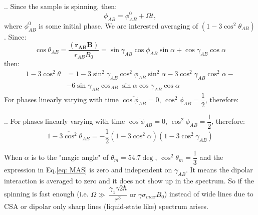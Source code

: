 \documentclass{beamer}
\begin{document}
\begin{frame}{\thesection.\thesubsection. \insertsubsection}
	 Since the sample is spinning, then:
	 \begin{equation}
	 \phi_{AB} = \phi_{AB}^0 + \Omega t,
	 \end{equation}
	 where $\phi_{AB}^0$ is some initial phase.
   We are interested averaging of $(1 - 3 \cos^2 \theta_{AB})$. Since:
   \begin{equation}
      \cos \theta_{AB} = \dfrac{(\bm{r_{AB}}  \bm{B})}{r_{AB} B_0} = \sin \gamma_{AB} \cos \phi_{AB} \sin \alpha + \cos \gamma_{AB} \cos \alpha
   \end{equation}
    then:
   \begin{align}
     1 - 3 \cos^2 \theta &= 1 - 3 \sin^2 \gamma_{AB} \cos^2 \phi_{AB} \sin^2 \alpha -3 \cos^2 \gamma_{AB} \cos^2 \alpha - \\
     &- 6 \sin \gamma_{AB} \cos_{AB} \sin \alpha \cos \gamma_{AB} \cos \alpha
   \end{align}
   For phases linearly varying with time $\overline{\cos \phi_{AB}} = 0 $,  $\overline{\cos^2 \phi_{AB}} = \dfrac{1}{2} $, therefore:
  

   
\end{frame}

\begin{frame}{\thesection.\thesubsection. \insertsubsection}
	 For phases linearly varying with time $\overline{\cos \phi_{AB}} = 0 $,  $\overline{\cos^2 \phi_{AB}} = \dfrac{1}{2} $, therefore:
	 \begin{equation} \label{eq: MAS}
	 \overline{1-3 \cos^2 \theta_{AB}} = -\dfrac{1}{2}(1 - 3 \cos^2 \alpha)(1 - 3 \cos^2 \gamma_{AB})
	 \end{equation}
	
	 When $\alpha$ is to the "magic angle" of $\theta_m =54.7 \deg$, $\cos^2 \theta_m = \dfrac{1}{3}$ and the expression in Eq.\ref{eq: MAS} is zero and independent on $\gamma_{AB}$. It means the dipolar interaction is averaged to zero and it does not show up in the spectrum. 
	 So if the spinning is fast enough (i.e. $\Omega \gg \ \dfrac{\gamma_1 \gamma2 \hbar}{r^3} \text{ or } \gamma \sigma_{max} B_0$) instead of wide lines due to CSA or dipolar only sharp lines (liquid-state like) spectrum arises. 
\end{frame}
\end{document}
